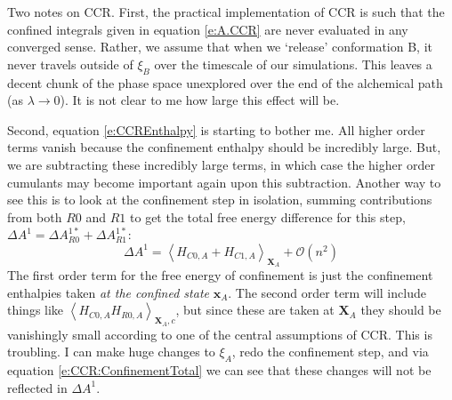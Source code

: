 \documentclass[%
 preprint,
 amsmath,amssymb,
 aps,
]{revtex4-1}
\renewcommand{\vec}[1]{{\mathbf{#1}}}
\begin{document}
Two notes on CCR.  First, the practical implementation of CCR is such that the confined integrals given in equation \ref{e:A.CCR} are never evaluated in any converged sense.  Rather, we assume that when we `release' conformation B, it never travels outside of $\xi_B$ over the timescale of our simulations.  This leaves a decent chunk of the phase space unexplored over the end of the alchemical path (as $\lambda \rightarrow 0$).  It is not clear to me how large this effect will be. 
 
 Second, equation \ref{e:CCREnthalpy} is starting to bother me.  All higher order terms vanish because the confinement enthalpy should be incredibly large.  But, we are subtracting these incredibly large terms, in which case the higher order cumulants may become important again upon this subtraction.  
 Another way to see this is to look at the confinement step in isolation, summing contributions from both $R0$ and $R1$ to get the total free energy difference for this step, $\Delta A^1 = \Delta A^{1*}_ {R0}+\Delta A^{1*}_ {R1}$:
 \begin{equation}
 \Delta A^1 =  \left \langle H_{C0,A}+H_{C1,A} \right \rangle_{\vec{X}_A} + \mathcal{O} (n^2)
 \label{e:CCR:ConfinementTotal}
 \end{equation}
 The first order term for the free energy of confinement is just the confinement enthalpies taken \emph{at the confined state} $\vec{x}_A$.  The second order term will include things like $\left \langle H_{C0,A} H_{R0,A} \right \rangle_{\vec{X}_A,c}$, but since these are taken at $\vec{X}_A$ they should be vanishingly small according to one of the central assumptions of CCR.  This is troubling.  I can make huge changes to $\xi_A$, redo the confinement step, and via equation \ref{e:CCR:ConfinementTotal} we can see that these changes will not be reflected in $ \Delta A^1$.  
 
\end{document}
